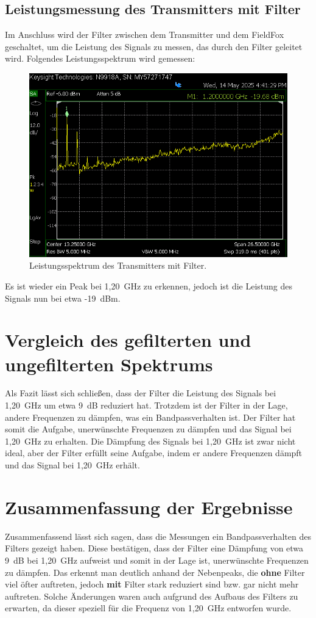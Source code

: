     \subsection{Leistungsmessung des Transmitters mit Filter}
    Im Anschluss wird der Filter zwischen dem Transmitter und dem FieldFox geschaltet, um die Leistung des Signals zu messen, das durch den Filter geleitet wird.
    Folgendes Leistungsspektrum wird gemessen:
    \begin{figure}[H]
        \centering
        \includegraphics[width=0.6\linewidth]{Pictures/SA-TranceiverMitFIlterPeakCooleGruppe.png}
        \caption{Leistungsspektrum des Transmitters mit Filter.}
        \label{fig:transmitter_spectrum_with_filter}
    \end{figure}
    Es ist wieder ein Peak bei 1,20~GHz zu erkennen, jedoch ist die Leistung des Signals nun bei etwa -19~dBm. 
\section{Vergleich des gefilterten und ungefilterten Spektrums}
Als Fazit lässt sich schließen, dass der Filter die Leistung des Signals bei 1,20~GHz um etwa 9~dB reduziert hat. Trotzdem ist der Filter in der Lage, andere Frequenzen zu dämpfen, was ein Bandpassverhalten ist. 
Der Filter hat somit die Aufgabe, unerwünschte Frequenzen zu dämpfen und das Signal bei 1,20~GHz zu erhalten. 
Die Dämpfung des Signals bei 1,20~GHz ist zwar nicht ideal, aber der Filter erfüllt seine Aufgabe, indem er andere Frequenzen dämpft und das Signal bei 1,20~GHz erhält.

\section{Zusammenfassung der Ergebnisse}
Zusammenfassend lässt sich sagen, dass die Messungen ein Bandpassverhalten des Filters gezeigt haben.
Diese bestätigen, dass der Filter eine Dämpfung von etwa 9~dB bei 1,20~GHz aufweist und somit in der Lage ist, unerwünschte Frequenzen zu dämpfen. Das erkennt man deutlich anhand der Nebenpeaks, die \textbf{ohne} Filter viel öfter auftreten, jedoch \textbf{mit} Filter stark reduziert sind bzw. gar nicht mehr auftreten.
Solche Änderungen waren auch aufgrund des Aufbaus des Filters zu erwarten, da dieser speziell für die Frequenz von 1,20~GHz entworfen wurde.